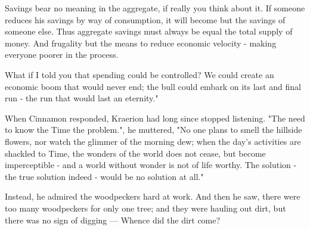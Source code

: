 Savings bear no meaning in the aggregate, if really you think about it. If someone reduces his savings by way of consumption, it will become  but the savings of someone else. Thus aggregate savings must always be equal the total supply of money. And frugality but the means to reduce economic velocity - making everyone poorer in the process.

What if I told you that spending could be controlled? We could create an economic boom that would never end; the bull could embark on its last and final run - the run that would last an eternity."

When Cinnamon responded, Kraerion had long since stopped listening. "The need to know the Time  the problem.", he muttered, "No one plans to smell the hillside flowers, nor watch the glimmer of the morning dew; when the day's activities are shackled to Time, the wonders of the world does not cease, but become imperceptible - and a world without wonder is not of life worthy. The solution - the true solution indeed - would be no solution at all."

Instead, he admired the woodpeckers hard at work. And then he saw, there were too many woodpeckers for only one tree; and they were hauling out dirt, but there was no sign of digging — Whence did the dirt come? 






